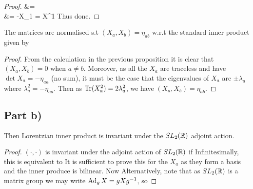 \documentclass{article}
\begin{document}
\begin{proof}
{&=   \\
&= -X_1 = X^1
}
 Thus done. 
\end{proof}

\begin{prop}
The matrices are normalised s.t $(X_a,X_b)=\eta_{ab}$ w.r.t the standard inner product given by 
\end{prop}
\begin{proof}
From the calculation in the previous proposition it is clear that $(X_a,X_b) = 0$ when $a \neq b$. Moreover, as all the $X_a$ are traceless and have $\det X_a=-\eta_{aa}$ (no sum), it must be the case that the eigenvalues of $X_a$ are $\pm \lambda_a$ where $\lambda_a^2 = -\eta_{aa}$. Then as $\operatorname{Tr}(X_a^2) = 2\lambda_a^2$, we have $(X_a,X_b) = \eta_{ab}$.
\end{proof}

\subsection{Part b)}

\begin{prop}
Then Lorentzian inner product is invariant under the $SL_2(\mathbb{R})$ adjoint action. 
\end{prop}
\begin{proof}
$(\cdot, \cdot)$ is invariant under the adjoint action of $SL_2(\mathbb{R})$ if 
Infinitesimally, this is equivalent to 
It is sufficient to prove this for the $X_a$ as they form a basis and the inner produce is bilinear. Now 
Alternatively, note that as $SL_2(\mathbb{R})$ is a matrix group we may write $\operatorname{Ad}_g X = g X g^{-1}$, so 
\end{proof}
\end{document}
